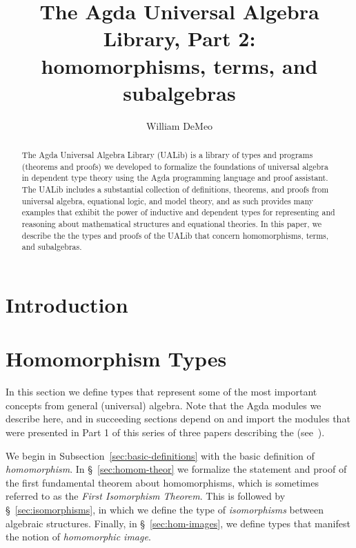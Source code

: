 \documentclass[a4paper,UKenglish,cleveref,autoref,thm-restate,11pt]{../lipics-v2021-wjd}
\title{The Agda Universal Algebra Library, Part 2:\\homomorphisms, terms, and subalgebras}
\author{William DeMeo}
       {Department of Algebra, Charles University in Prague \and \url{https://williamdemeo.gitlab.io}}
       {williamdemeo@gmail.com}
       {https://orcid.org/0000-0003-1832-5690}
       {}
\begin{document}
\maketitle


\begin{abstract}
The Agda Universal Algebra Library (UALib) is a library of types and programs (theorems and proofs) we developed to formalize the foundations of universal algebra in dependent type theory using the Agda programming language and proof assistant. 
 The UALib includes a substantial collection of definitions, theorems, and proofs from universal algebra, equational logic, and model theory, and as such provides many examples that exhibit the power of inductive and dependent types for representing and reasoning about mathematical structures and equational theories. In this paper, we describe the the types and proofs of the UALib that concern homomorphisms, terms, and subalgebras.
\end{abstract}

\newpage

\setcounter{tocdepth}{2}
\tableofcontents

\section{Introduction}\label{sec:introduction}


\newcommand\firstsentence[2]{This section describes certain key components of the #1 module of the \agdaualib.\footnote{For more details, see #2.}}

\section{Homomorphism Types}\label{sec:homomorphism-types}
In this section we define types that represent some of the most important concepts from general (universal) algebra.  Note that the Agda modules we describe here, and in succeeding sections depend on and import the modules that were presented in Part 1 of this series of three papers describing the \agdaualib (see~\cite{DeMeo:2021-1}). 

We begin in Subsection~\ref{sec:basic-definitions} with the basic definition of \emph{homomorphism}. In \S~\ref{sec:homom-theor} we formalize the statement and proof of the first fundamental theorem about homomorphisms, which is sometimes referred to as the \emph{First Isomorphism Theorem}. This is followed by \S~\ref{sec:isomorphisms}, in which we define the type of \emph{isomorphisms} between algebraic structures.  Finally, in \S~\ref{sec:hom-images}, we define types that manifest the notion of \emph{homomorphic image}.
\end{document}
